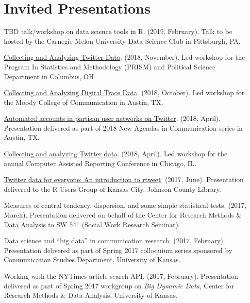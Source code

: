 \section{Invited Presentations}
  \begin{bibenum}
    \item[] TBD talk/workshop on data science tools in R. (2019, February).
      Talk to be hosted by the Carnegie Melon University Data Science Club in Pittsburgh, PA.
    \item[] \href{https://rtweet-workshop.mikewk.com}{Collecting and Analyzing Twitter Data}. (2018, November).
      Led workshop for the Program In Statistics and Methodology (PRISM) and Political Science Department in Columbus, OH.
    \item[] \href{https://mkearney.github.io/moody_rstats}{Collecting and Analyzing Digital Trace Data}. (2018, October).
      Led workshop for the Moody College of Communication in Austin, TX.
    \item[] \href{https://mkearney.github.io/utchapter/presentation}{Automated accounts in partisan user networks on Twitter}. (2018, April).
      Presentation delivered as part of 2018 New Agendas in Communication series in Austin, TX.
    \item[] \href{https://mkearney.github.io/nicar_tworkshop}{Collecting and analyzing Twitter data}. (2018, April).
      Led workshop for the annual Computer Assisted Reporting Conference in Chicago, IL.
    \item[] \href{https://mkearney.github.io/rusersKC}{Twitter data for everyone: An introduction to rtweet}. (2017, June).
      Presentation delivered to the R Users Group of Kansas City, Johnson County Library.
    \item[] Measures of central tendency, dispersion, and some simple statistical tests. (2017, March).
      Presentation delivered on behalf of the Center for Research Methods \& Data Analysis to SW 541 (Social Work Research Seminar).
    \item[] \href{https://mkearney.github.io/COLLOQUIUM/slides.html}{Data science and ``big data'' in communication research}. (2017, February).
      Presentation delivered as part of Spring 2017 colloquium series sponsored by Communication Studies Department, University of Kansas.
    \item[] Working with the NYTimes article search API. (2017, February).
      Presentation delivered as part of Spring 2017 workgroup on \textit{Big Dynamic Data},
      Center for Research Methods \& Data Analysis, University of Kansas.

\end{bibenum}
